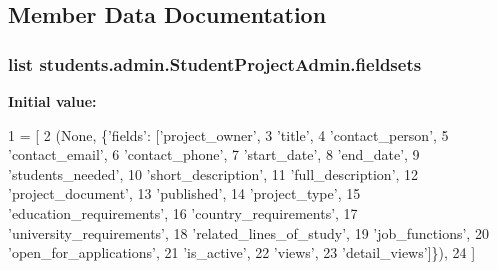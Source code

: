 \subsection{Member Data Documentation}
\hypertarget{classstudents_1_1admin_1_1_student_project_admin_ac705b970c858c3a69887299a50844624}{
\subsubsection[{fieldsets}]{\setlength{\rightskip}{0pt plus 5cm}list students.\-admin.\-Student\-Project\-Admin.\-fieldsets\hspace{0.3cm}{\ttfamily [static]}}}\label{classstudents_1_1admin_1_1_student_project_admin_ac705b970c858c3a69887299a50844624}
{\bfseries Initial value\-:}
\begin{DoxyCode}
1 = [
2         (\textcolor{keywordtype}{None}, \{\textcolor{stringliteral}{'fields'}: [\textcolor{stringliteral}{'project\_owner'},
3                            \textcolor{stringliteral}{'title'},
4                            \textcolor{stringliteral}{'contact\_person'},
5                            \textcolor{stringliteral}{'contact\_email'},
6                            \textcolor{stringliteral}{'contact\_phone'},
7                            \textcolor{stringliteral}{'start\_date'},
8                            \textcolor{stringliteral}{'end\_date'},
9                            \textcolor{stringliteral}{'students\_needed'},
10                            \textcolor{stringliteral}{'short\_description'},
11                            \textcolor{stringliteral}{'full\_description'},
12                            \textcolor{stringliteral}{'project\_document'},
13                            \textcolor{stringliteral}{'published'},
14                            \textcolor{stringliteral}{'project\_type'},
15                            \textcolor{stringliteral}{'education\_requirements'},
16                            \textcolor{stringliteral}{'country\_requirements'},
17                            \textcolor{stringliteral}{'university\_requirements'},
18                            \textcolor{stringliteral}{'related\_lines\_of\_study'},
19                            \textcolor{stringliteral}{'job\_functions'},
20                            \textcolor{stringliteral}{'open\_for\_applications'},
21                            \textcolor{stringliteral}{'is\_active'},
22                            \textcolor{stringliteral}{'views'},
23                            \textcolor{stringliteral}{'detail\_views'}]\}),
24     ]
\end{DoxyCode}
